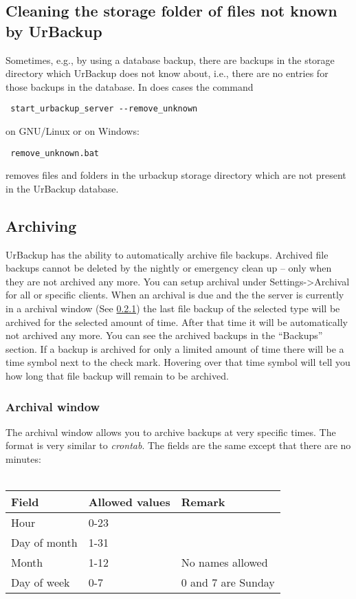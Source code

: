 \documentclass[a4paper,10pt]{article}
\begin{document}
\subsection{Cleaning the storage folder of files not known by UrBackup}

Sometimes, e.g., by using a database backup, there are backups in the storage directory which UrBackup does not know about, i.e., there are no entries for those backups in the database.
In does cases the command
 \begin{verbatim}
 start_urbackup_server --remove_unknown
 \end{verbatim}
 on GNU/Linux or on Windows:
 \begin{verbatim}
 remove_unknown.bat
 \end{verbatim}
removes files and folders in the urbackup storage directory which are not present in the UrBackup database.

\subsection{Archiving}
\label{subsec:archiving}

UrBackup has the ability to automatically archive file backups. Archived file backups
cannot be deleted by the nightly or emergency clean up -- only when they are not archived
any more. You can setup archival under Settings->Archival for all or specific clients.
When an archival is due and the the server is currently in a archival window (See \ref{subsub:archival_window})
the last file backup of the selected type will be archived for the selected amount of time.
After that time it will be automatically not archived any more. You can see the archived backups
in the ``Backups'' section. If a backup is archived for only a limited amount of time there
will be a time symbol next to the check mark. Hovering over that time symbol will tell you
how long that file backup will remain to be archived.

\subsubsection{Archival window}
\label{subsub:archival_window}

The archival window allows you to archive backups at very specific times. The format is
very similar to \textsl{crontab}. The fields are the same except that there are no minutes:\\
\\
\begin{tabular}{|l|l|l|}
\hline
Field & Allowed values & Remark\\
\hline \hline
Hour & 0-23 &\\
\hline
Day of month & 1-31& \\
\hline
Month & 1-12 & No names allowed \\
\hline
Day of week & 0-7 & 0 and 7 are Sunday\\
\hline
\end{tabular}\\
\end{document}
